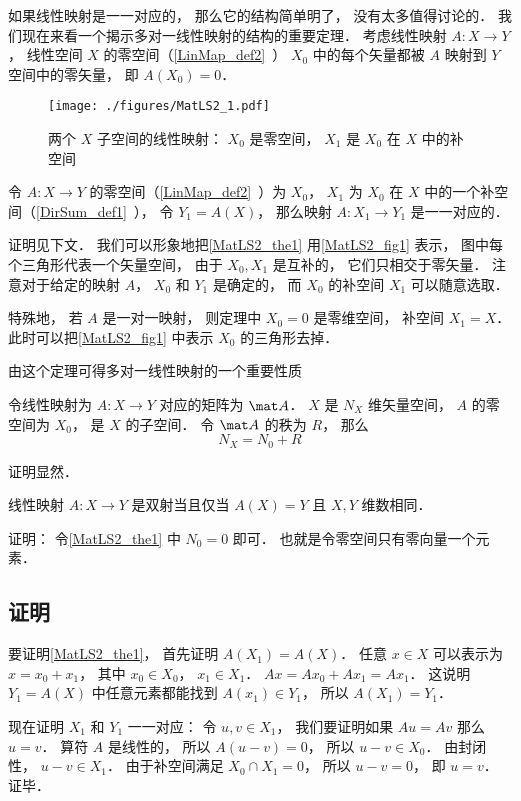 

如果线性映射是一一对应的， 那么它的结构简单明了， 没有太多值得讨论的． 我们现在来看一个揭示多对一线性映射的结构的重要定理． 考虑线性映射 $A:X\to Y$， 线性空间 $X$ 的零空间（\autoref{LinMap_def2}~） $X_0$ 中的每个矢量都被 $A$ 映射到 $Y$ 空间中的零矢量， 即 $A(X_0) = \qty{0}$．

\begin{figure}[ht]
\centering
\texttt{[image: ./figures/MatLS2\_1.pdf]}
\caption{两个 $X$ 子空间的线性映射： $X_0$ 是零空间， $X_1$ 是 $X_0$ 在 $X$ 中的补空间} \label{MatLS2_fig1}
\end{figure}

\begin{theorem}{}\label{MatLS2_the1}
令 $A:X \to Y$ 的零空间（\autoref{LinMap_def2}~）为 $X_0$， $X_1$ 为 $X_0$ 在 $X$ 中的一个补空间（\autoref{DirSum_def1}~）， 令 $Y_1 = A(X)$， 那么映射 $A:X_1\to Y_1$ 是一一对应的．
\end{theorem}
证明见下文． 我们可以形象地把\autoref{MatLS2_the1} 用\autoref{MatLS2_fig1} 表示， 图中每个三角形代表一个矢量空间， 由于 $X_0, X_1$ 是互补的， 它们只相交于零矢量． 注意对于给定的映射 $A$， $X_0$ 和 $Y_1$ 是确定的， 而 $X_0$ 的补空间 $X_1$ 可以随意选取．

特殊地， 若 $A$ 是一对一映射， 则定理中 $X_0 = \qty{0}$ 是零维空间， 补空间 $X_1 = X$． 此时可以把\autoref{MatLS2_fig1} 中表示 $X_0$ 的三角形去掉．

由这个定理可得多对一线性映射的一个重要性质
\begin{corollary}{}
令线性映射为 $A:X\to Y$ 对应的矩阵为 $\mat A$． $X$ 是 $N_X$ 维矢量空间， $A$ 的零空间为 $X_0$， 是 $X$ 的子空间． 令 $\mat A$ 的秩为 $R$， 那么
\begin{equation}\label{MatLS2_eq1}
N_X = N_0 + R
\end{equation}
\end{corollary}
证明显然．

\begin{corollary}{}
线性映射 $A:X\to Y$ 是双射当且仅当 $A(X) = Y$ 且 $X,Y$ 维数相同．
\end{corollary}
证明： 令\autoref{MatLS2_the1} 中 $N_0 = 0$ 即可． 也就是令零空间只有零向量一个元素．

\subsection{证明}
要证明\autoref{MatLS2_the1}， 首先证明 $A(X_1) = A(X)$． 任意 $x\in X$ 可以表示为 $x = x_0 + x_1$， 其中 $x_0\in X_0$， $x_1\in X_1$． $Ax = A x_0 + A x_1 = A x_1$． 这说明 $Y_1 = A(X)$ 中任意元素都能找到 $A(x_1) \in Y_1$， 所以 $A(X_1) = Y_1$．

现在证明 $X_1$ 和 $Y_1$ 一一对应： 令 $u, v \in X_1$， 我们要证明如果 $Au = Av$ 那么 $u = v$． 算符 $A$ 是线性的， 所以 $A(u-v) = 0$， 所以 $u - v \in X_0$． 由封闭性， $u - v \in X_1$． 由于补空间满足 $X_0 \cap X_1 = \qty{0}$， 所以 $u - v = 0$， 即 $u = v$． 证毕．


